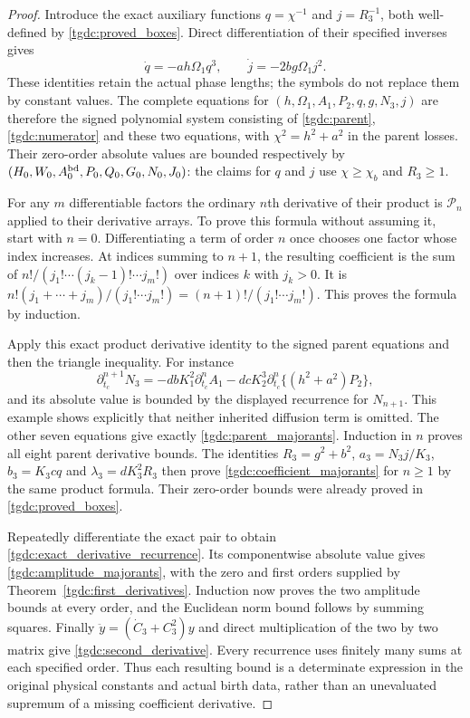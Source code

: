 \documentclass[11pt]{article}
\begin{document}
\begin{proof}
Introduce the exact auxiliary functions $q=\chi^{-1}$ and
$j=R_3^{-1}$, both well-defined by \eqref{tgdc:proved_boxes}.
Direct differentiation of their specified inverses gives
\[
 \dot q=-ah\Omega_1q^3,\qquad
 \dot j=-2bg\Omega_1j^2.
\]
These identities retain the actual phase lengths; the symbols do not
replace them by constant values. The complete equations for
$(h,\Omega_1,A_1,P_2,q,g,N_3,j)$ are therefore the signed polynomial
system consisting of \eqref{tgdc:parent}, \eqref{tgdc:numerator} and
these two equations, with $\chi^2=h^2+a^2$ in the parent losses.
Their zero-order absolute values are bounded respectively by
$(H_0,W_0,A_0^{\rm bd},P_0,Q_0,G_0,N_0,J_0)$:
the claims for $q$ and $j$ use $\chi\geq\chi_b$ and $R_3\geq1$.

For any $m$ differentiable factors the ordinary $n$th derivative of
their product is $\mathcal P_n$ applied to their derivative arrays.
To prove this formula without assuming it, start with $n=0$.
Differentiating a term of order $n$ once chooses one factor whose
index increases. At indices summing to $n+1$, the resulting coefficient
is the sum of $n!/(j_1!\cdots(j_k-1)!\cdots j_m!)$ over indices
$k$ with $j_k>0$. It is
$n!(j_1+\cdots+j_m)/(j_1!\cdots j_m!)=(n+1)!/(j_1!\cdots j_m!)$.
This proves the formula by induction.

Apply this exact product derivative identity to the signed parent
equations and then the triangle inequality. For instance
\[
 \partial_{t_c}^{n+1}N_3
  =-dbK_1^2\partial_{t_c}^n A_1
   -dcK_2^3\partial_{t_c}^n\{(h^2+a^2)P_2\},
\]
and its absolute value is bounded by the displayed recurrence for
$N_{n+1}$. This example shows explicitly that neither inherited
diffusion term is omitted. The other seven equations give exactly
\eqref{tgdc:parent_majorants}. Induction in $n$ proves all eight parent
derivative bounds. The identities $R_3=g^2+b^2$,
$a_3=N_3j/K_3$, $b_3=K_3cq$ and $\lambda_3=dK_3^2R_3$ then prove
\eqref{tgdc:coefficient_majorants} for $n\geq1$ by the same product
formula. Their zero-order bounds were already proved in
\eqref{tgdc:proved_boxes}.

Repeatedly differentiate the exact pair to obtain
\eqref{tgdc:exact_derivative_recurrence}. Its componentwise absolute
value gives \eqref{tgdc:amplitude_majorants}, with the zero and first
orders supplied by Theorem~\ref{tgdc:first_derivatives}. Induction
now proves the two amplitude bounds at every order, and the Euclidean
norm bound follows by summing squares. Finally
$\ddot y=(\dot C_3+C_3^2)y$ and direct multiplication of the two by two
matrix give \eqref{tgdc:second_derivative}. Every recurrence uses
finitely many sums at each specified order. Thus each resulting bound
is a determinate expression in the original physical constants and
actual birth data, rather than an unevaluated supremum of a missing
coefficient derivative.
\end{proof}
\end{document}
